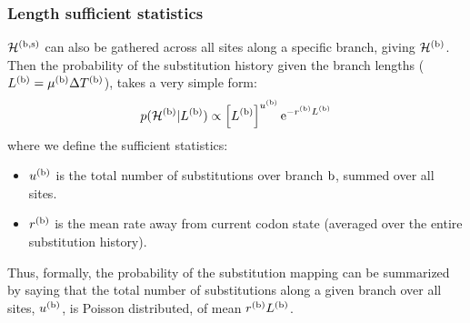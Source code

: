 \subsubsection{Length sufficient statistics}
$\mathcal{H}^{(\text{b}, \text{s})}$ can also be gathered across all sites along a specific branch, giving $\mathcal{H}^{(\text{b})}$.
Then the probability of the substitution history given the branch lengths ($L^{(\text{b})} = \mu^{(\text{b})} \Delta T^{(\text{b})}$), takes a very simple form:
\begin{equation}
    \label{eq:LengthSuffStat}
    p(\mathcal{H}^{(\text{b})} | L^{(\text{b})}) \propto \left[ L^{(\text{b})}\right]^{u^{(\text{b})}} \mathrm{e}^{- r^{(\text{b})} L^{(\text{b})}}
\end{equation}
where we define the sufficient statistics:
\begin{itemize}
    \setlength\itemsep{-0.25em}
    \item $u^{(\text{b})}$ is the total number of substitutions over branch $\text{b}$, summed over all sites.
    \item $r^{(\text{b})}$ is the mean rate away from current codon state (averaged over the entire substitution history).
\end{itemize}
Thus, formally, the probability of the substitution mapping can be summarized by saying that the total number of substitutions along a given branch over all sites, $u^{(\text{b})}$, is Poisson distributed, of mean $r^{(\text{b})} L^{(\text{b})}$.

